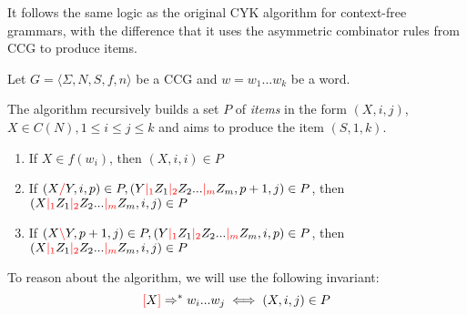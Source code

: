 \documentclass[main.tex]{subfiles}
\begin{document}
It follows the same logic as the original CYK algorithm for context-free
grammars, with the difference that it uses the asymmetric combinator rules
from CCG to produce items.

Let $ G = \langle \Sigma, N, S, f, n \rangle $ be a CCG and $w = w_1 ... w_k$
be a word.

The algorithm recursively builds a set $P$ of \emph{items} in the form
$(X, i, j)$, $X \in C(N), 1 \leq i \leq j \leq k$ and aims to produce the item
$(S, 1, k)$.

\begin{enumerate}
\label{cyk:rules}
    \item If $X \in f(w_i)$, then $(X, i, i) \in P$
    \item If $(X \textcolor{red}{/} Y, i, p) \in P, (Y \textcolor{red}{|_{1}} Z_1 \textcolor{red}{|_{2}} Z_2 ... \textcolor{red}{|_{m}} Z_m, p + 1, j) \in P$,
        then $(X \textcolor{red}{|_{1}} Z_1 \textcolor{red}{|_{2}} Z_2 ... \textcolor{red}{|_{m}} Z_m, i, j) \in P$
    \item If $(X \textcolor{red}{\backslash} Y, p + 1, j) \in P, (Y \textcolor{red}{|_{1}} Z_1 \textcolor{red}{|_{2}} Z_2 ... \textcolor{red}{|_{m}} Z_m, i, p) \in P$,
        then $(X \textcolor{red}{|_{1}} Z_1 \textcolor{red}{|_{2}} Z_2 ... \textcolor{red}{|_{m}} Z_m, i, j) \in P$
\end{enumerate}

To reason about the algorithm, we will use the following invariant:
\begin{equation}
    \textcolor{red}{[} X \textcolor{red}{]} \Rightarrow^* w_i ... w_j \iff (X, i, j) \in P
\end{equation}
\end{document}
